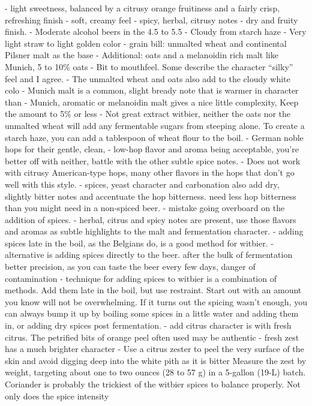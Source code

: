 \documentclass[a4paper,parskip=half]{scrartcl}
\begin{document}
- light sweetness, balanced by a citrusy orange fruitiness and a fairly crisp, refreshing finish
- soft, creamy feel
- spicy, herbal, citrusy notes
- dry and fruity finish.
- Moderate alcohol beers in the 4.5 to 5.5%
- Cloudy from starch haze
- Very light straw to light golden color
- grain bill: unmalted wheat and continental Pilsner malt as the base
- Additional: oats and a melanoidin rich malt like Munich, 5 to 10\% oats
- Bit to mouthfeel. Some describe the character “silky” feel and I agree.
- The unmalted wheat and oats also add to the cloudy white colo
- Munich malt is a common, slight bready note that is warmer in character than
- Munich, aromatic or melanoidin malt gives a nice little complexity, Keep the amount to 5\% or less
- Not great extract witbier, neither the oats nor the unmalted wheat will add any fermentable sugars from steeping
alone. To create a starch haze, you can add a tablespoon of wheat flour to the boil.
- German noble hops for their gentle, clean,
- low-hop flavor and aroma being acceptable, you’re better off with neither, battle with the other subtle spice notes.
- Does not work with citrusy American-type hops, many other flavors in the hops that don’t go well with this style.
- spices, yeast character and carbonation also add dry, slightly bitter notes and accentuate the hop bitterness. need less hop bitterness than you might need in a non-spiced beer.
- mistake going overboard on the addition of spices.
- herbal, citrus and spicy notes are present, use those flavors and aromas as subtle highlights to the malt and fermentation character.
- adding spices late in the boil, as the Belgians do, is a good method for witbier.
- alternative is adding spices directly to the beer. after the bulk of fermentation better precision, as you can taste the beer every few days, danger of contamination
- technique for adding spices to witbier is a combination of methods. Add them late in the boil, but use
restraint. Start out with an amount you know will not be overwhelming. If it turns out the spicing wasn’t
enough, you can always bump it up by boiling some spices in a little water and adding them in, or adding dry
spices post fermentation.
- add citrus character is with fresh citrus. The petrified bits of orange peel often used may be
authentic
- fresh zest has a much brighter character
- Use a citrus zester to peel the very surface of the skin and avoid digging deep into the white pith as it is bitter Measure the zest by weight, targeting about one to two ounces (28 to 57 g) in a 5-gallon
(19-L) batch.
Coriander is probably the trickiest of the witbier spices to balance properly. Not only does the spice intensity
\end{document}
